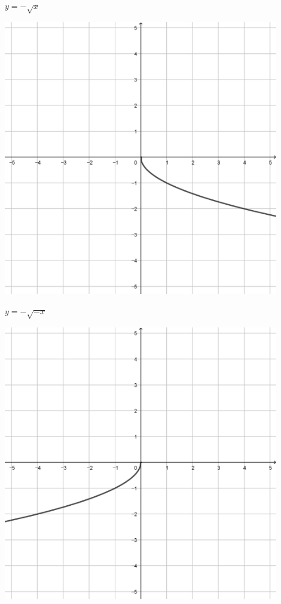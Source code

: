 \documentclass[a4paper]{oblivoir}
\begin{document}
\begin{minipage}{0.45\textwidth}\centering
\(y=-\sqrt x\)
\par\bigskip\includegraphics[width=0.9\textwidth]{img/22-3}
\end{minipage}
\begin{minipage}{0.45\textwidth}\centering
\(y=-\sqrt{-x}\)
\par\bigskip\includegraphics[width=0.9\textwidth]{img/22-4}
\end{minipage}\bigskip\bigskip\par
\end{document}

